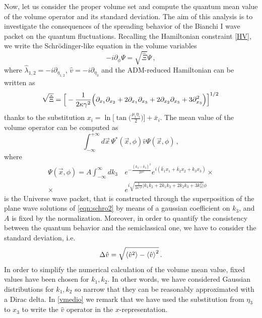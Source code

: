 \documentclass[aps,prd,twocolumn,nofootinbib,superscriptaddress]{revtex4-2}
\begin{document}
Now, let us consider the proper volume set and compute the quantum mean value of the volume operator and its standard deviation. The aim of this analysis is to investigate the consequences of the spreading behavior of the Bianchi I wave packet on the quantum fluctuations. Recalling the Hamiltonian constraint \eqref{HV}, we write the Schr\"{o}dinger-like equation in the volume variables
\begin{equation}
	\label{eqn:schro2}
-i\partial_{\phi}\Psi=\sqrt{\hat{\Xi}}\Psi\,,
\end{equation}
where $\hat{\lambda}_{1,2}=-i\partial_{\eta_{1,2}}$, $\hat{v}=-i\partial_{\eta_3}$ and the ADM-reduced Hamiltonian can be written as
\begin{equation}
\sqrt{\hat{\Xi}}=\Big[-{1\over2\kappa\gamma^{2}}\Big( \partial_{x_{1}}\partial_{x_{2}}+2\partial_{x_{1}}\partial_{x_{3}}+2 \partial_{x_{2}}\partial_{x_{3}}+3\partial^2_{x_{3}}\Big)\Big]^{1/2}\,
\end{equation}
thanks to the substitution $x_i=\ln\big[{\tan\big({\frac{\mu_i \eta_i}{2}}}\big)\big]+\bar{x}_i$. The mean value of the volume operator can be computed as
\begin{equation}
\int_{-\infty}^{+\infty}d\vec{x}\,\Psi^*(\vec{x},\phi)\hat{v}\Psi(\vec{x},\phi)\,,
\label{vmedio}
\end{equation}
where
\begin{equation}
	\label{packbis2}
\begin{aligned}
	\Psi(\vec{x},\phi)=A\int_{-\infty}^{\infty}dk_3\,&e^{-\frac{(k_3-\bar{k}_3)^2}{2\sigma^2}}e^{i(\bar{k}_1x_1+\bar{k}_2x_2+k_3x_3)}\times \\ \times &e^{i\sqrt{\frac{1}{2\kappa\gamma^2}\big|\bar{k}_1\bar{k}_2+2\bar{k}_1k_3+2\bar{k}_2k_3+3k_3^2\big|}\phi}
\end{aligned}
\end{equation}
is the Universe wave packet, that is constructed through the superposition of the plane wave solutions of \eqref{eqn:schro2} by means of a gaussian coefficient on $k_3$, and $A$ is fixed by the normalization. Moreover, in order to quantify the consistency between the quantum behavior and the semiclassical one, we have to consider the standard deviation, i.e.
\begin{equation}
	\Delta\hat{v}=\sqrt{\braket{\hat{v}^2}-\braket{\hat{v}}^2}\,.
\end{equation}
In order to simplify the numerical calculation of the volume mean value, fixed values have been chosen for $k_1,k_2$. In other words, we have considered Gaussian distributions for $k_1,k_2$ so narrow that they can be reasonably approximated with a Dirac delta. In \eqref{vmedio} we remark that we have used the substitution from $\eta_3$ to $x_3$ to write the $\hat{v}$ operator in the $x$-representation. 
\end{document}
